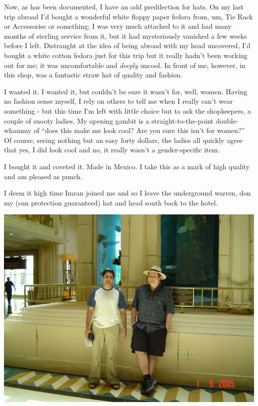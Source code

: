 \documentclass[a5paper,titlepage,11pt,draft]{book}
\begin{document}
Now, as has been documented, I have an odd predilection for hats.  On my last trip abroad I'd bought a wonderful white floppy paper fedora from, um, Tie Rack or Accessorise or something; I was very much attached to it and had many months of sterling service from it, but it had mysteriously vanished a few weeks before I left.  Distraught at the idea of being abroad with my head uncovered, I'd bought a white cotton fedora just for this trip but it really hadn't been working out for me; it was uncomfortable and \emph{deeply} uncool.  In front of me, however, in this shop, was a fantastic straw hat of quality and fashion.

I wanted it.  I wanted it, but couldn't be sure it wasn't for, well, women.  Having no fashion sense myself, I rely on others to tell me when I really can't wear something - but this time I'm left with little choice but to ask the shopkeepers, a couple of snooty ladies.  My opening gambit is a straight-to-the-point double-whammy of ``does this make me look cool?  Are you sure this isn't for women?''  Of course, seeing nothing but an easy forty dollars, the ladies all quickly agree that yes, I did look cool and no, it really wasn't a gender-specific item.

I bought it and coveted it.  Made in Mexico. I take this as a mark of high quality and am pleased as punch.

I deem it high time Imran joined me and so I leave the underground warren, don my (sun protection guaranteed) hat and head south back to the hotel.

\begin{center}\includegraphics[width=\textwidth]{gfx/DSC00685}\end{center}
\end{document}
